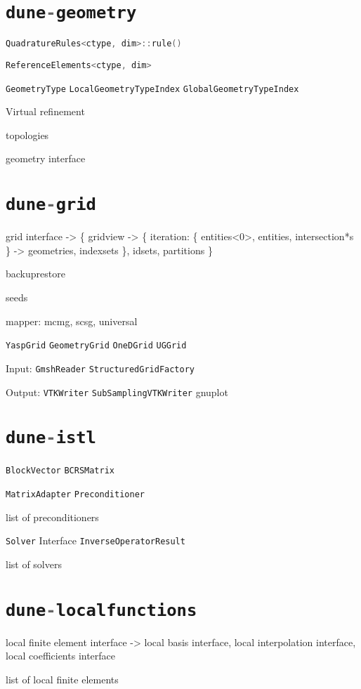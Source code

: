 \documentclass[11pt,DIV=13]{scrartcl}
\def\cxx{\lstinline[language=C++]}
\begin{document}


\section*{\cxx{dune-geometry}}

\cxx{QuadratureRules<ctype, dim>::rule()}

\cxx{ReferenceElements<ctype, dim>}

\cxx{GeometryType} \cxx{LocalGeometryTypeIndex} \cxx{GlobalGeometryTypeIndex}

Virtual refinement

topologies

geometry interface

\section*{\cxx{dune-grid}}

grid interface -> \{ gridview -> \{ iteration: \{ entities<0>, entities,
      intersection*s \} -> geometries, indexsets \}, idsets, partitions \}

backuprestore

seeds

mapper: mcmg, scsg, universal

\cxx{YaspGrid} \cxx{GeometryGrid} \cxx{OneDGrid} \cxx{UGGrid}

Input: \cxx{GmshReader} \cxx{StructuredGridFactory}

Output: \cxx{VTKWriter} \cxx{SubSamplingVTKWriter} gnuplot

\section*{\cxx{dune-istl}}

\cxx{BlockVector} \cxx{BCRSMatrix}

\cxx{MatrixAdapter} \cxx{Preconditioner}

list of preconditioners

\cxx{Solver} Interface \cxx{InverseOperatorResult}

list of solvers

\section*{\cxx{dune-localfunctions}}

local finite element interface -> { local basis interface, local interpolation
  interface, local coefficients interface }

list of local finite elements
\end{document}
